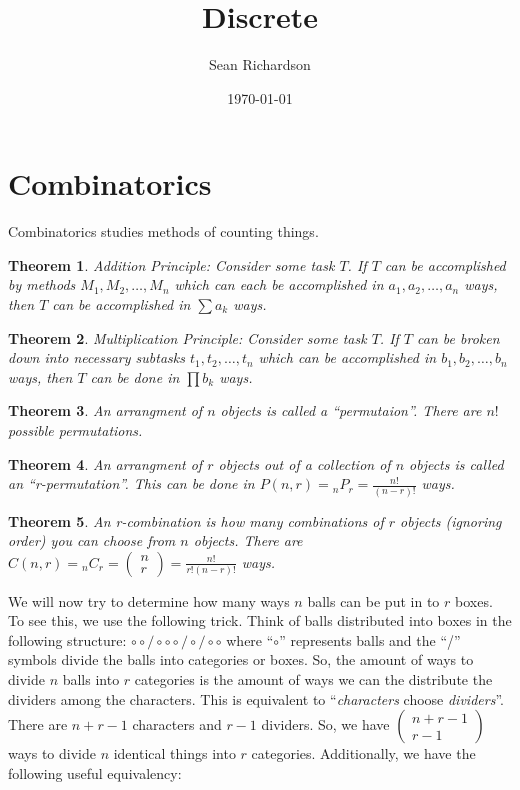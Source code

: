 \documentclass[11pt]{article}
\newtheorem{theorem}{Theorem}
\begin{document}
\title{Discrete}
\author{Sean Richardson}
\date{\today}
\maketitle

\section{Combinatorics}

Combinatorics studies methods of counting things.

\begin{theorem}
    Addition Principle: Consider some task $T$. If $T$ can be accomplished by methods $M_1,M_2,\dots,M_n$ which can each be accomplished in $a_1, a_2, \dots, a_n$ ways, then $T$ can be accomplished in $\sum a_k$ ways.
\end{theorem}
\begin{theorem}
    Multiplication Principle: Consider some task $T$. If $T$ can be broken down into necessary subtasks $t_1,t_2,\dots,t_n$ which can be accomplished in $b_1,b_2,\dots,b_n$ ways, then $T$ can be done in $\prod b_k$ ways.
\end{theorem}
\begin{theorem}
    An arrangment of $n$ objects is called a ``permutaion''. There are $n!$ possible permutations.
\end{theorem}
\begin{theorem}
    An arrangment of $r$ objects out of a collection of $n$ objects is called an ``r-permutation''. This can be done in $P(n,r)= {}_{n}P_r = \frac{n!}{(n-r)!}$ ways.
\end{theorem}
\begin{theorem}
    An r-combination is how many combinations of $r$ objects (ignoring order) you can choose from $n$ objects. There are $C(n,r)={}_{n}C_r=(\begin{smallmatrix}n \\ r \end{smallmatrix}) = \frac{n!}{r!(n-r)!}$ ways.
\end{theorem}
We will now try to determine how many ways $n$ balls can be put in to $r$ boxes. To see this, we use the following trick. Think of balls distributed into boxes in the following structure: $\circ \circ / \circ \circ \circ / \circ / \circ \circ$ where ``$\circ$'' represents balls and the ``/'' symbols divide the balls into categories or boxes. So, the amount of ways to divide $n$ balls into $r$ categories is the amount of ways we can the distribute the dividers among the characters. This is equivalent to ``\textit{characters} choose \textit{dividers}''. There are $n+r-1$ characters and $r-1$ dividers. So, we have $(\begin{smallmatrix} n+r-1 \\ r-1 \end{smallmatrix})$ ways to divide $n$ identical things into $r$ categories. Additionally, we have the following useful equivalency:
\end{document}
